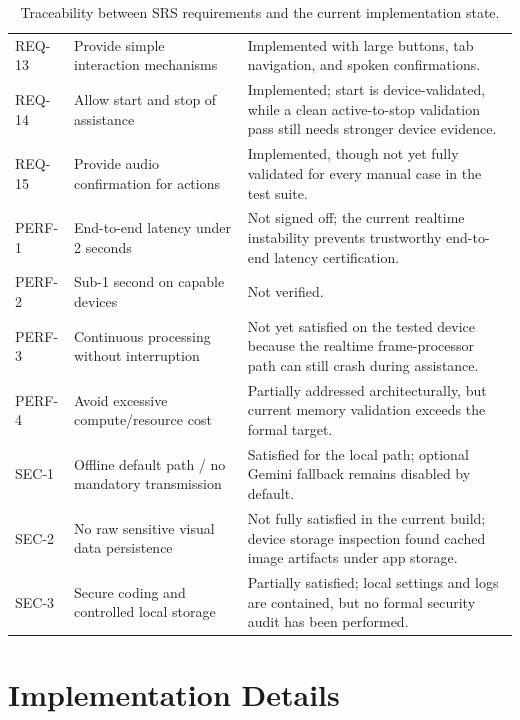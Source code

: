 \documentclass[conference]{IEEEtran}
\begin{document}
\begin{table}[t]
\begin{tabularx}{\textwidth}{>{\raggedright\arraybackslash}p{} >{\raggedright\arraybackslash}p{} >{\raggedright\arraybackslash}X}
REQ-13 & Provide simple interaction mechanisms & Implemented with large buttons, tab navigation, and spoken confirmations. \\
REQ-14 & Allow start and stop of assistance & Implemented; start is device-validated, while a clean active-to-stop validation pass still needs stronger device evidence. \\
REQ-15 & Provide audio confirmation for actions & Implemented, though not yet fully validated for every manual case in the test suite. \\
PERF-1 & End-to-end latency under 2 seconds & Not signed off; the current realtime instability prevents trustworthy end-to-end latency certification. \\
PERF-2 & Sub-1 second on capable devices & Not verified. \\
PERF-3 & Continuous processing without interruption & Not yet satisfied on the tested device because the realtime frame-processor path can still crash during assistance. \\
PERF-4 & Avoid excessive compute/resource cost & Partially addressed architecturally, but current memory validation exceeds the formal target. \\
SEC-1 & Offline default path / no mandatory transmission & Satisfied for the local path; optional Gemini fallback remains disabled by default. \\
SEC-2 & No raw sensitive visual data persistence & Not fully satisfied in the current build; device storage inspection found cached image artifacts under app storage. \\
SEC-3 & Secure coding and controlled local storage & Partially satisfied; local settings and logs are contained, but no formal security audit has been performed. \\
\bottomrule
\end{tabularx}
\caption{Traceability between SRS requirements and the current implementation state.}
\label{tab:traceability}
\end{table}

\section{Implementation Details}
\end{document}
